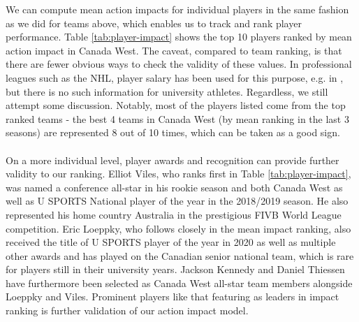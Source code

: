 \documentclass{sfuthesis}
\begin{document}
We can compute mean action impacts for individual players in the same fashion as we did for teams above, which enables us to track and rank player performance. Table \ref{tab:player-impact} shows the top 10 players ranked by mean action impact in Canada West. The caveat, compared to team ranking, is that there are fewer obvious ways to check the validity of these values. In professional leagues such as the NHL, player salary has been used for this purpose, e.g. in \cite{schulte2017apples}, but there is no such information for university athletes. Regardless, we still attempt some discussion. Notably, most of the players listed come from the top ranked teams - the best 4 teams in Canada West (by mean ranking in the last 3 seasons) are represented 8 out of 10 times, which can be taken as a good sign.\\\\
On a more individual level, player awards and recognition can provide further validity to our ranking. Elliot Viles, who ranks first in Table \ref{tab:player-impact}, was named a conference all-star in his rookie season and both Canada West as well as U SPORTS National player of the year in the 2018/2019 season. He also represented his home country Australia in the prestigious FIVB World League competition. Eric Loeppky, who follows closely in the mean impact ranking, also received the title of U SPORTS player of the year in 2020 as well as multiple other awards and has played on the Canadian senior national team, which is rare for players still in their university years. Jackson Kennedy and Daniel Thiessen have furthermore been selected as Canada West all-star team members alongside Loeppky and Viles. Prominent players like that featuring as leaders in impact ranking is further validation of our action impact model.
\end{document}
